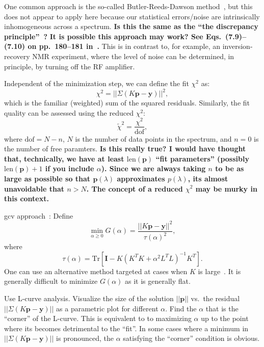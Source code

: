 One common approach is the so-called Butler-Reeds-Dawson method~\cite{1981-Butler-SIAMJNMA-18-381}, but this does not appear to apply here because our statistical errors/noise are intrinsically inhomogeneous across a spectrum.
\textbf{Is this the same as the ``the discrepancy principle''~\cite{1966-Morozon-DANSSR-167-510}?}
\textbf{It is possible this approach may work? See Eqs.~(7.9)--(7.10) on pp.~180--181 in~\cite{1998-Hansen-RDDIPP}.}
This is in contrast to, for example, an inversion-recovery NMR experiment, where the level of noise can be determined, in principle, by turning off the RF amplifier.



Independent of the minimization step, we can define the fit $\chi^{2}$ as:
\begin{equation} \label{eq:chi2}
   \chi^{2} = || \Sigma \left ( K \mathbf{p} - \mathbf{y} \right ) ||^{2} ,
\end{equation}
which is the familiar (weighted) sum of the squared residuals.
Similarly, the fit quality can be assessed using the reduced $\chi^{2}$:
\begin{equation} \label{eq:reduced-chi2}
   \tilde{\chi}^{2} = \frac{ \chi^{2} }{ \mathrm{dof} },
\end{equation}
where $\mathrm{dof} = N - n$, $N$ is the number of data points in the spectrum, and $n = 0$ is the number of free paramters.
\textbf{%
Is this really true?
I would have thought that, technically, we have at least $\mathrm{len} ( \mathbf{p} )$ ``fit parameters'' (possibly $\mathrm{len} ( \mathbf{p} ) + 1$ if you include $\alpha$).
Since we are always taking $n$ to be as large as possible so that $\mathbf{p} ( \lambda )$ approximates $p ( \lambda )$, its almost unavoidable that $n > N$.
The concept of a reduced $\chi^{2}$ may be murky in this context.
}




\gls{gcv} approach~\cite{1978-Craven-NM-31-377}:
Define
\begin{equation}
\label{eq:gcv}
   \min_{\alpha \geq 0} G ( \alpha ) = \frac{ || K \mathbf{p} - \mathbf{y} ||^{2} }{ \tau ( \alpha )^{2} } ,
\end{equation}
where
\begin{equation}
   \tau ( \alpha ) = \mathrm{Tr} \left [ \mathbf{I} - K \left ( K^{T} K + \alpha^{2} L^{T} L \right )^{-1} K^{T} \right ] .
\end{equation}
One can use an alternative method targeted at cases when $K$ is large~\cite{1997-Golub-JCGS-6-1}.
It is generally difficult to minimize $G ( \alpha )$ as it is generally flat.



Use L-curve analysis.
Visualize the size of the solution $|| \mathbf{p} ||$ vs.\ the residual $|| \Sigma ( K \mathbf{p} - \mathbf{y} ) ||$ as a parametric plot for different $\alpha$.
Find the $\alpha$ that is the ``corner'' of the L-curve.
This is equivalent to to maximizing $\alpha$ up to the point where its becomes detrimental to the ``fit''.
In some cases where a minimum in $|| \Sigma ( K \mathbf{p} - \mathbf{y} ) ||$ is pronounced, the $\alpha$ satisfying the ``corner'' condition is obvious.
